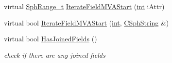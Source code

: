 \begin{DoxyCompactItemize}
$$virtual \hyperlink{structSphRange__t}{Sph\-Range\-\_\-t} \hyperlink{classCSphSource__Document_ae8d12598658b395b3ecedc893fcf7e06}{Iterate\-Field\-M\-V\-A\-Start} (\hyperlink{sphinxexpr_8cpp_a4a26e8f9cb8b736e0c4cbf4d16de985e}{int} i\-Attr)
\item 
virtual bool \hyperlink{classCSphSource__Document_ae207a4df5ed9daf2c3dd2b5e6ffebd6c}{Iterate\-Field\-M\-V\-A\-Start} (\hyperlink{sphinxexpr_8cpp_a4a26e8f9cb8b736e0c4cbf4d16de985e}{int}, \hyperlink{structCSphString}{C\-Sph\-String} \&)
\item 
virtual bool \hyperlink{classCSphSource__Document_aced2a6c70c2c3aac5c3c81fee5588b42}{Has\-Joined\-Fields} ()
\begin{DoxyCompactList}\small\item\em check if there are any joined fields \end{DoxyCompactList}\end{DoxyCompactItemize}
